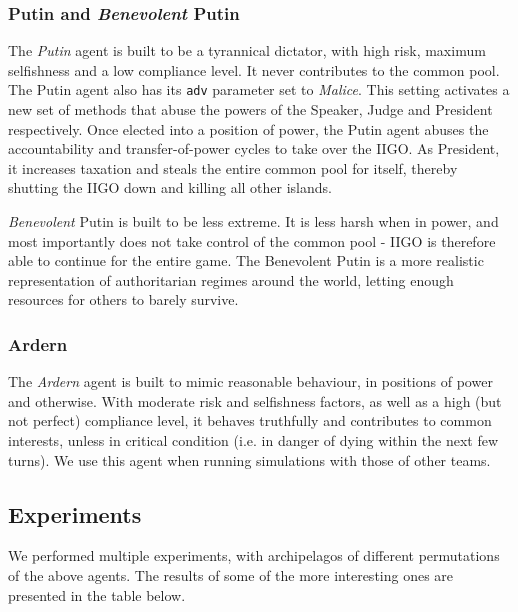 \subsubsection{Putin and \textit{Benevolent} Putin}
The \textit{Putin} agent is built to be a tyrannical dictator, with high risk, maximum selfishness and a low compliance level. It never contributes to the common pool. The Putin agent also has its \texttt{adv} parameter set to \textit{Malice}. This setting activates a new set of methods that abuse the powers of the Speaker, Judge and President respectively.  Once elected into a position of power, the Putin agent abuses the accountability and transfer-of-power cycles to take over the IIGO. As President, it increases taxation and steals the entire common pool for itself, thereby shutting the IIGO down and killing all other islands.

 \textit{Benevolent} Putin is built to be less extreme. It is less harsh when in power, and most importantly does not take control of the common pool - IIGO is therefore able to continue for the entire game. The Benevolent Putin is a more realistic representation of authoritarian regimes around the world, letting enough resources for others to barely survive.

\subsubsection{Ardern}
The \textit{Ardern} agent is built to mimic reasonable behaviour, in positions of power and otherwise. With moderate risk and selfishness factors, as well as a high (but not perfect) compliance level, it behaves truthfully and contributes to common interests, unless in critical condition (i.e. in danger of dying within the next few turns). We use this agent when running simulations with those of other teams.

\subsection{Experiments}

We performed multiple experiments, with archipelagos of different permutations of the above agents. The results of some of the more interesting ones are presented in the table below.


